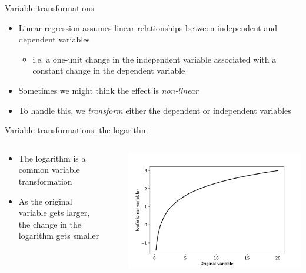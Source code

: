 \begin{frame}{Variable transformations}
  \begin{itemize}
    \item Linear regression assumes linear relationships between independent and dependent variables
    \begin{itemize}
      \item i.e. a one-unit change in the independent variable associated with a constant change in the dependent variable
    \end{itemize}
    \item Sometimes we might think the effect is \emph{non-linear}
    \item To handle this, we \emph{transform} either the dependent or independent variables
  \end{itemize}
\end{frame}

\begin{frame}{Variable transformations: the logarithm}
  \begin{columns}
    \begin{column}{0.65\textwidth}
      \begin{itemize}
        \item The logarithm is a common variable transformation
        \item As the original variable gets larger, the change in the logarithm gets smaller
      \end{itemize}
    \end{column}~%
    \begin{column}{0.34\textwidth}
      \includegraphics[width=\textwidth]{fig/log.pdf}
    \end{column}
  \end{columns}
\end{frame}

